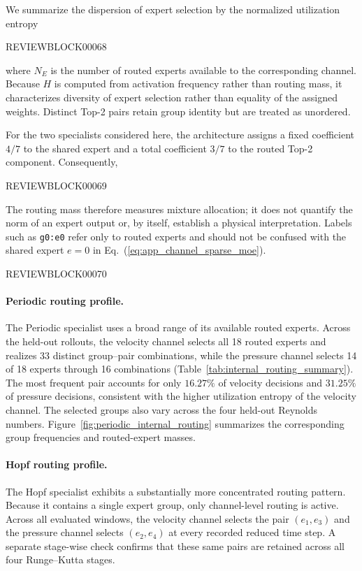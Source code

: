 \documentclass{article}
\def\plaineqref#1{\ref{#1}}
\begin{document}
We summarize the dispersion of expert selection by the normalized utilization entropy


REVIEWBLOCK00068


where $N_E$ is the number of routed experts available to the corresponding channel. Because $H$ is computed from activation frequency rather than routing mass, it characterizes diversity of expert selection rather than equality of the assigned weights. Distinct Top-2 pairs retain group identity but are treated as unordered.

For the two specialists considered here, the architecture assigns a fixed coefficient $4/7$ to the shared expert and a total coefficient $3/7$ to the routed Top-2 component. Consequently,


REVIEWBLOCK00069


The routing mass therefore measures mixture allocation; it does not quantify the norm of an expert output or, by itself, establish a physical interpretation.
Labels such as \texttt{g0:e0} refer only to routed experts and should not be confused with the shared expert $e=0$ in
Eq.~(\plaineqref{eq:app_channel_sparse_moe}).

\par


REVIEWBLOCK00070


\par

\paragraph{Periodic routing profile.}
The Periodic specialist uses a broad range of its available routed experts. Across the held-out rollouts, the velocity channel selects all 18 routed experts and realizes 33 distinct group--pair combinations, while the pressure channel selects 14 of 18 experts through 16 combinations (Table~\ref{tab:internal_routing_summary}). The most frequent pair accounts for only $16.27\%$ of velocity decisions and $31.25\%$ of pressure decisions, consistent with the higher utilization entropy of the velocity channel. The selected groups also vary across the four held-out Reynolds numbers.
Figure~\ref{fig:periodic_internal_routing} summarizes the corresponding group frequencies and routed-expert masses.



\paragraph{Hopf routing profile.}
The Hopf specialist exhibits a substantially more concentrated routing pattern. Because it contains a single expert group, only channel-level routing is active. Across all evaluated windows, the velocity channel selects the pair
$(e_1,e_3)$ and the pressure channel selects $(e_2,e_4)$ at every recorded reduced time step. A separate stage-wise check confirms that these same pairs are retained across all four Runge--Kutta stages.
\end{document}
